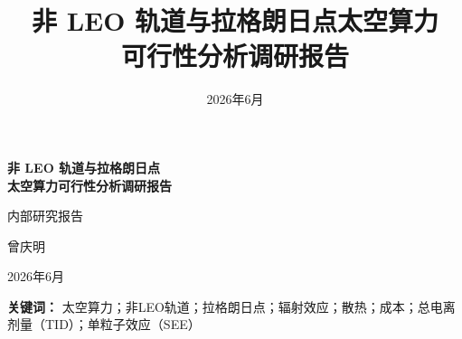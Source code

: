 \documentclass[12pt,a4paper]{article}
\title{非 LEO 轨道与拉格朗日点太空算力\\可行性分析调研报告}
\author{}
\date{2026年6月}
\begin{document}
\begin{titlepage}
    \centering
    \vspace*{2cm}

    {\Huge\bfseries 非 LEO 轨道与拉格朗日点\\太空算力可行性分析调研报告\par}

    \vspace{0.8cm}

    {\Large 内部研究报告\par}

    \vspace{2cm}

    {\Large 曾庆明\par}

    \vspace{2cm}

    {\large 2026年6月\par}

    \vfill

\renewcommand{\thefootnote}{\arabic{footnote}}
\end{titlepage}

\begin{abstract}

\end{abstract}

\vspace{1em}
\noindent\textbf{关键词：} 太空算力；非LEO轨道；拉格朗日点；辐射效应；散热；\deltav 成本；总电离剂量（TID）；单粒子效应（SEE）

\newpage

\tableofcontents
\newpage










\printbibliography[heading=bibintoc,title={参考文献}]
\end{document}
